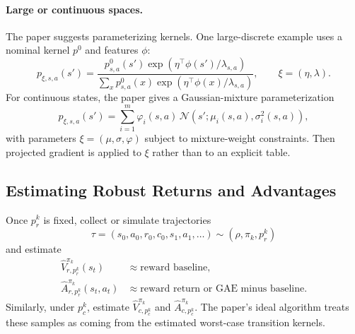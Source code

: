 \documentclass[11pt]{article}
\begin{document}
\paragraph{Large or continuous spaces.}
The paper suggests parameterizing kernels.  One large-discrete example uses a nominal kernel $p^0$ and features $\phi$:
\begin{equation}
    p_{\xi,s,a}(s')=
    \frac{p^0_{s,a}(s')\exp\left(\eta^\top\phi(s')/\lambda_{s,a}\right)}
    {\sum_x p^0_{s,a}(x)\exp\left(\eta^\top\phi(x)/\lambda_{s,a}\right)},
    \qquad \xi=(\eta,\lambda).
\end{equation}
For continuous states, the paper gives a Gaussian-mixture parameterization
\begin{equation}
    p_{\xi,s,a}(s')=\sum_{i=1}^m \varphi_i(s,a)\,\mathcal N(s';\mu_i(s,a),\sigma_i^2(s,a)),
\end{equation}
with parameters $\xi=(\mu,\sigma,\varphi)$ subject to mixture-weight constraints.  Then projected gradient is applied to $\xi$ rather than to an explicit table.

\subsection{Estimating Robust Returns and Advantages}
Once $p_r^k$ is fixed, collect or simulate trajectories
\begin{equation}
    \tau=(s_0,a_0,r_0,c_0,s_1,a_1,\ldots)
    \sim (\rho,\pi_k,p_r^k)
\end{equation}
and estimate
\begin{align}
    \widehat V^{\pi_k}_{r,p_r^k}(s_t)&\approx \text{reward baseline},\\
    \widehat A^{\pi_k}_{r,p_r^k}(s_t,a_t)&\approx \text{reward return or GAE minus baseline}.
\end{align}
Similarly, under $p_c^k$, estimate $\widehat V^{\pi_k}_{c,p_c^k}$ and $\widehat A^{\pi_k}_{c,p_c^k}$.  The paper's ideal algorithm treats these samples as coming from the estimated worst-case transition kernels.
\end{document}
